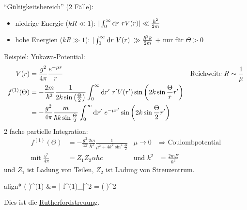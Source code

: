 	``Gültigkeitsbereich'' (2 Fälle):
		\begin{itemize}
			\item niedrige Energie ($kR \ll 1$):
			$| \int_0^\infty \mathrm{d} r ~r V(r)|
			\ll \frac{\hbar^2}{2m}$
			\item hohe Energien ($kR \gg 1$):
			$ | \int_0^\infty \mathrm{d} r ~V(r)| 
			\gg \frac{\hbar^2 k}{2m}$ 
			+ nur für $\Theta > 0$
		\end{itemize}
	Beispiel: Yukawa-Potential: 
		\begin{align*}
			V(r) &= \frac{g^2}{4 \pi} \frac{e^{-\mu r}}{r}
			& &\text{Reichweite } R \sim \frac{1}{\mu} \\
			f^{(1)} (\Theta) 
			&= - \frac{2m}{\hbar^2} \frac{1}{2 k \sin \left(\frac{\Theta}{2}\right)} 
			\int_0^\infty \mathrm{d} r' ~r' V(r')
			\sin \left(2 k \sin \frac{\Theta}{r} r'\right) \\
			&= - \frac{g^2}{4 \pi} \frac{m}{\hbar k \sin \frac{\Theta}{2}}
			\int_0^\infty \mathrm{d} r' ~e^{-\mu r'} 
			\sin \left(2 k \sin \frac{\Theta}{2} r' \right)
		\end{align*}
	2 fache partielle Integration:
		\begin{align*}
			f^{(1)}(\Theta) 
			&= - \frac{g^2}{4 \pi} \frac{2m}{\hbar^2}
			\frac{1}{\mu^2 +  4 k^2 \sin^2 \frac{\Theta}{2}}
			& \mu \rightarrow 0 
			&\Rightarrow \text{ Coulombpotential} \\
			\text{mit } \frac{g^2}{4 \pi} 
			&= Z_1 Z_2 \alpha \hbar c 
			& \text{und } k^2 &= \frac{2mE}{\hbar^2}
		\end{align*}
	und $Z_1$ ist Ladung von Teilen, $Z_2$ ist Ladung von Streuzentrum.
		\begin{empheq}[box=\boxed]{align*}
			\left( \frac{\diff \sigma}{\diff \Omega} \right)^{(1)} 
			&= | f^{(1)}_{}|^2
			= \left(
			\right)^2
		\end{empheq}
	Dies ist die \underline{Rutherfordstreuung}.
	
